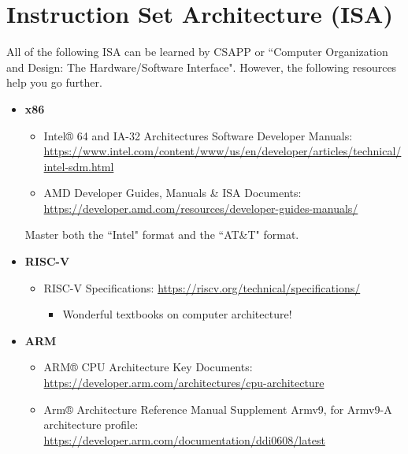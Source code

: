 \documentclass{article}
\begin{document}
\section{Instruction Set Architecture (ISA)}
All of the following ISA can be learned by CSAPP or ``Computer Organization and Design: The Hardware/Software Interface".
However, the following resources help you go further.
\begin{itemize}
    \item \textbf{x86}
    \begin{itemize}
        \item Intel® 64 and IA-32 Architectures Software Developer Manuals:\\
        \href{https://www.intel.com/content/www/us/en/developer/articles/technical/intel-sdm.html}{https://www.intel.com/content/www/us/en/developer/articles/technical/intel-sdm.html}
        \item AMD Developer Guides, Manuals \& ISA Documents:\\
        \href{https://developer.amd.com/resources/developer-guides-manuals/}{https://developer.amd.com/resources/developer-guides-manuals/}
    \end{itemize}
    Master both the ``Intel" format and the ``AT\&T" format.
    \item \textbf{RISC-V}
    \begin{itemize}
        \item RISC-V Specifications:
        \href{https://riscv.org/technical/specifications/}{https://riscv.org/technical/specifications/}
        \begin{itemize}
            \item Wonderful textbooks on computer architecture!
        \end{itemize}
    \end{itemize}
    \item \textbf{ARM}
    \begin{itemize}
        \item ARM® CPU Architecture Key Documents:\\
        \href{https://developer.arm.com/architectures/cpu-architecture}{https://developer.arm.com/architectures/cpu-architecture}
        \item Arm® Architecture Reference Manual Supplement Armv9, for Armv9-A architecture profile:
        \href{https://developer.arm.com/documentation/ddi0608/latest}{https://developer.arm.com/documentation/ddi0608/latest}
    \end{itemize}

\end{itemize}
\end{document}
